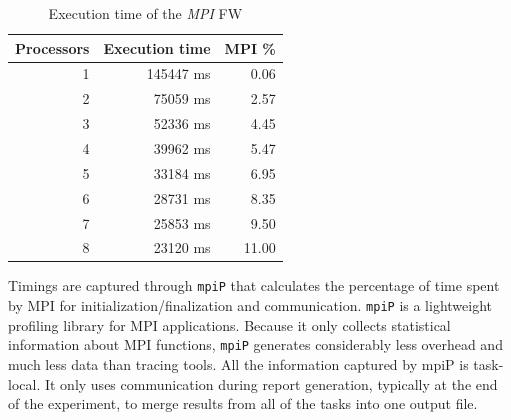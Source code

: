 \begin{table}[h!]
\centering
\begin{tabular}{|r|r|r|}
\hline
\rowcolor[HTML]{F56B00} 
{\color[HTML]{FFFFFF} \textbf{Processors}} & {\color[HTML]{FFFFFF} \textbf{Execution time}} & {\color[HTML]{FFFFFF} \textbf{MPI \%}} \\ \hline
1                                          & 145447 ms                                               & 0.06                                 \\ \hline
2                                          & 75059 ms                                               & 2.57                                 \\ \hline
3                                          & 52336 ms                                               & 4.45                                \\ \hline
4                                          & 39962 ms                                               & 5.47                                \\ \hline
5                                          & 33184 ms                                               & 6.95                                 \\ \hline
6                                          & 28731 ms                                               & 8.35                                \\ \hline
7                                          & 25853 ms                                               & 9.50                                 \\ \hline
8                                          & 23120 ms                                               & 11.00                                \\ \hline
\end{tabular}
\caption{Execution time of the \emph{MPI} FW}                                                                                                                                            
\label{tab:mpi-time}
\end{table}
Timings are captured through \texttt{mpiP} that calculates the percentage of time spent by MPI for initialization/finalization and communication.
\texttt{mpiP} is a lightweight profiling library for MPI applications. Because it only collects statistical information about MPI functions, \texttt{mpiP} generates considerably less overhead and much less data than tracing tools. All the information captured by mpiP is task-local. It only uses communication during report generation, typically at the end of the experiment, to merge results from all of the tasks into one output file.


